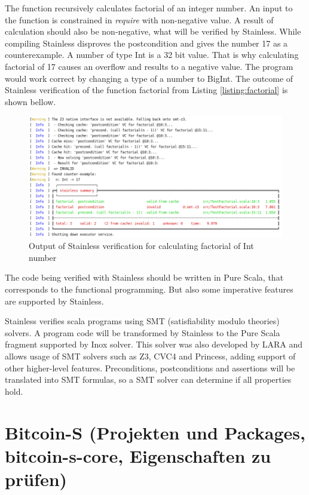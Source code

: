 The function recursively calculates factorial of an integer number. An input to the function is constrained in \textit{require} with non-negative value. A result of calculation should also be non-negative, what will be verified by Stainless.
While compiling Stainless disproves the postcondition and gives the number 17 as a counterexample. A number of type Int is a 32 bit value. That is why calculating factorial of 17 causes an overflow and results to a negative value. The program would work correct by changing a type of a number to BigInt.
The outcome of Stainless verification of the function factorial from Listing \ref{listing:factorial} is shown bellow.

\begin{figure}[H]
	\centering
		\includegraphics[scale=0.5]{images/output1.png}
	\caption{Output of Stainless verification for calculating factorial of Int number}
	\label{fig:output1}
\end{figure}

The code being verified with Stainless should be written in Pure Scala, that corresponds to the functional programming. But also some imperative features are supported by Stainless.

Stainless verifies scala programs using SMT (satisfiability modulo theories) solvers. A program code will be transformed by Stainless to the Pure Scala fragment supported by Inox solver. 
This solver was also developed by LARA and allows usage of SMT solvers such as Z3, CVC4 and Princess, adding support of other higher-level features.
Preconditions, postconditions and assertions will be translated into SMT formulas, so a SMT solver can determine if all properties hold.


\section{Bitcoin-S (Projekten und Packages, bitcoin-s-core, Eigenschaften zu prüfen)}
\label{sec:bitcoin_s}

